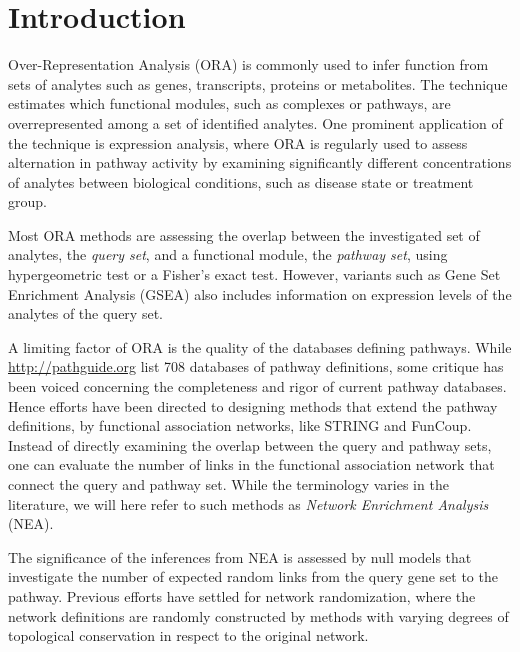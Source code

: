 \documentclass[10pt,letterpaper]{article}
\begin{document}
\section*{Introduction}

Over-Representation Analysis (ORA) is commonly used to infer function from sets of analytes such as genes, transcripts, proteins or metabolites\cite{tavazoie1999systematic,khatri2012ten,goeman2007analyzing}. The technique estimates which functional modules, such as complexes or pathways, are overrepresented among a set of identified analytes. One prominent application of the technique is expression analysis, where ORA is regularly used to assess alternation in pathway activity by examining significantly different concentrations of analytes between biological conditions, such as disease state or treatment group.

Most ORA methods are assessing the overlap between the investigated set of analytes, the {\em query set}, and a functional module, the {\em pathway set}, using hypergeometric test or a Fisher's exact test. However, variants such as Gene Set Enrichment Analysis (GSEA)\cite{subramanian2005gene} also includes information on expression levels of the analytes of the query set.

A limiting factor of ORA is the quality of the databases defining pathways. While \url{http://pathguide.org} list 708 databases of pathway definitions\cite{bader2006pathguide},  some critique has been voiced concerning the completeness and rigor of current pathway databases. Hence efforts have been directed to designing methods that extend the pathway definitions, by functional association networks, like STRING\cite{szklarczyk2014string} and FunCoup\cite{ogris2017funcoup}. Instead of directly examining the overlap between the query and pathway sets, one can evaluate the number of links in the functional association network that connect the query and pathway set\cite{alexeyenko2012network, glaab2012enrichnet, mccormack2013statistical, ogris2016novel, signorelli2016neat}. While the terminology varies in the literature, we will here refer to such methods as {\em Network Enrichment Analysis} (NEA).

The significance of the inferences from NEA is assessed by null models that investigate the number of expected random links from the query gene set to the pathway. Previous efforts have settled for network randomization, where the network definitions are randomly constructed by methods with varying degrees of topological conservation in respect to the original network.
\end{document}
